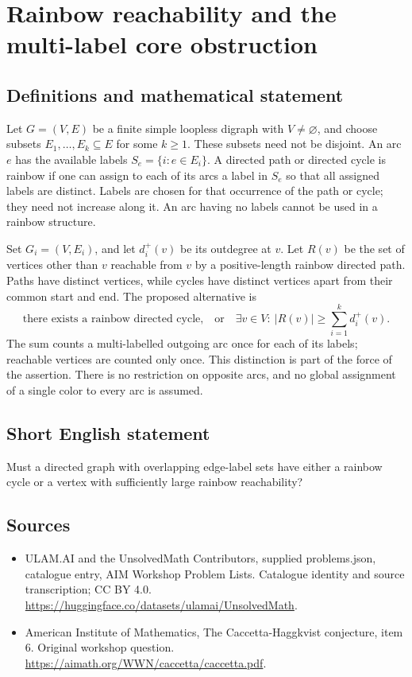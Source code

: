 \documentclass[11pt,a4paper]{article}
\begin{document}
\section*{Rainbow reachability and the multi-label core obstruction}\label{statement}

\subsection{Definitions and mathematical statement}
Let $G=(V,E)$ be a finite simple loopless digraph with $V\ne\varnothing$,
and choose subsets $E_1,\ldots,E_k\subseteq E$ for some $k\ge1$.
These subsets need not be disjoint. An arc $e$ has the available labels
$S_e=\{i:e\in E_i\}$. A directed path or directed cycle is rainbow
if one can assign to each of its arcs a label in $S_e$ so that all
assigned labels are distinct. Labels are chosen for that occurrence
of the path or cycle; they need not increase along it.
An arc having no labels cannot be used in a rainbow structure.

Set $G_i=(V,E_i)$, and let $d_i^+(v)$ be its outdegree at $v$.
Let $R(v)$ be the set of vertices other than $v$ reachable from $v$
by a positive-length rainbow directed path. Paths have distinct
vertices, while cycles have distinct vertices apart from their common
start and end. The proposed alternative is
\[
 \text{there exists a rainbow directed cycle,}
 \quad\text{or}\quad
 \exists v\in V:\ |R(v)|\ge\sum_{i=1}^k d_i^+(v).
\]
The sum counts a multi-labelled outgoing arc once for each of its
labels; reachable vertices are counted only once. This distinction
is part of the force of the assertion. There is no restriction on
opposite arcs, and no global assignment of a single color to every
arc is assumed.
\subsection{Short English statement}
Must a directed graph with overlapping edge-label sets have either a rainbow cycle or a vertex with sufficiently large rainbow reachability?
\subsection{Sources}
\begin{itemize}
\item[S1] ULAM.AI and the UnsolvedMath Contributors, supplied problems.json, catalogue entry, AIM Workshop Problem Lists. Catalogue identity and source transcription; CC BY 4.0.
\url{https://huggingface.co/datasets/ulamai/UnsolvedMath}.
\item[S2] American Institute of Mathematics, The Caccetta-Haggkvist conjecture, item 6. Original workshop question.
\url{https://aimath.org/WWN/caccetta/caccetta.pdf}.
\end{itemize}
\end{document}
